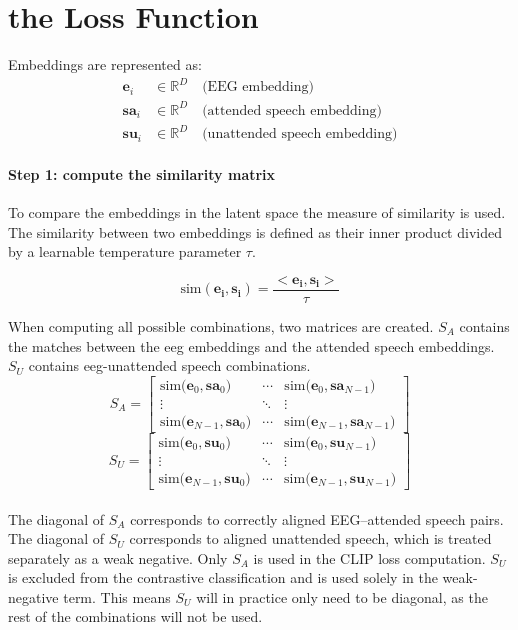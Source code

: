 \chapter{the Loss Function}
\label{loss}


\newcommand{\eeg}{\mathbf{e}}
\newcommand{\att}{\mathbf{sa}}
\newcommand{\unatt}{\mathbf{su}}
\newcommand{\sima}[2]{\mathrm{sim}\bigl(\mathbf{\eeg}_{#1}, \mathbf{\att}_{#2}\bigr)}
\newcommand{\simu}[2]{\mathrm{sim}\bigl(\mathbf{\eeg}_{#1}, \mathbf{\unatt}_{#2}\bigr)}


Embeddings are represented as: 
\begin{align*}
\eeg_i &\in \mathbb{R}^D \quad \text{(EEG embedding)}\\
\att_i &\in \mathbb{R}^D \quad \text{(attended speech embedding)}\\
\unatt_i &\in \mathbb{R}^D \quad \text{(unattended speech embedding)}
\end{align*}

\subsubsection*{Step 1: compute the similarity matrix}
To compare the embeddings in the latent space the measure of similarity is used. The similarity between two embeddings is defined as their inner product divided by a learnable temperature parameter $\tau$.

\[
\mathrm{sim}(\mathbf{\eeg_i},\mathbf{s_i}) = \frac{<\mathbf{\eeg_i},\mathbf{s_i}>}{\tau}
\]

When computing all possible combinations, two matrices are created. $S_A$ contains the matches between the eeg embeddings and the attended speech embeddings. $S_U$ contains eeg-unattended speech combinations.
\[
S_A = \begin{bmatrix}
\sima{0}{0} & \cdots & \sima{0}{N-1} \\
\vdots & \ddots & \vdots\\
\sima{N-1}{0} & \cdots & \sima{N-1}{N-1}
\end{bmatrix}
\]
\[
S_U = \begin{bmatrix}
\simu{0}{0} & \cdots & \simu{0}{N-1} \\
\vdots & \ddots & \vdots\\
\simu{N-1}{0} & \cdots & \simu{N-1}{N-1}
\end{bmatrix}
\]
\\
The diagonal of $S_A$ corresponds to correctly aligned EEG–attended speech pairs.
The diagonal of $S_U$ corresponds to aligned unattended speech, which is treated separately as a weak negative. Only $S_A$ is used in the CLIP loss computation. $S_U$ is excluded from the contrastive classification and is used solely in the weak-negative term. This means $S_U$ will in practice only need to be diagonal, as the rest of the combinations will not be used.

